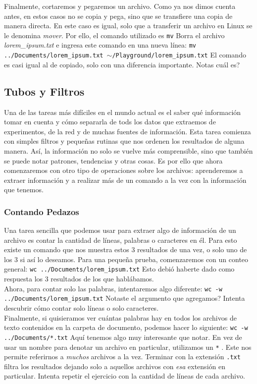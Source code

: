 \documentclass[10pt,letterpaper]{article}
\newcommand{\inlinecode}[1]{
\colorbox{light-gray}{\texttt{#1}}
}
\begin{document}
Finalmente, cortaremos y pegaremos un archivo. Como ya nos dimos cuenta antes, en estos casos no se copia y pega, sino que se transfiere una copia de manera directa. En este caso es igual, solo que a transferir un archivo en Linux se le denomina \emph{mover}. Por ello, el comando utilizado es \inlinecode{mv} Borra el archivo \emph{lorem\_ipsum.txt} e ingresa este comando en una nueva l\'inea: \inlinecode{mv ../Documents/lorem\_ipsum.txt $ \sim $/Playground/lorem\_ipsum.txt} El comando es casi igual al de copiado, solo con una diferencia importante. Notas cu\'al es?

\subsection{Tubos y Filtros}
Una de las tareas m\'as dif\'iciles en el mundo actual es el saber qu\'e informaci\'on tomar en cuenta y c\'omo separarla de tods los datos que extraemos de experimentos, de la red y de muchas fuentes de informaci\'on. Esta tarea comienza con simples filtros y peque\~nas rutinas que nos ordenen los resultados de alguna manera. As\'i, la informaci\'on no solo se vuelve m\'as comprensible, sino que tambi\'en se puede notar patrones, tendencias y otras cosas. Es por ello que ahora comenzaremos con otro tipo de operaciones sobre los archivos: aprenderemos a extraer informaci\'on y a realizar m\'as de un comando a la vez con la informaci\'on que tenemos.

\subsubsection{Contando Pedazos}
Una tarea sencilla que podemos usar para extraer algo de informaci\'on de un archivo es contar la cantidad de l\'ineas, palabras o caracteres en \'el. Para esto existe un comando que nos muestra estos 3 resultados de una vez, o solo uno de los 3 si as\'i lo deseamos. Para una peque\~na prueba, comenzaremos con un conteo general: \inlinecode{wc ../Documents/lorem\_ipsum.txt} Esto debi\'o haberte dado como respuesta los 3 resultados de los que habl\'abamos.\\

Ahora, para contar solo las palabras, intentaremos algo diferente: \inlinecode{wc -w ../Documents/lorem\_ipsum.txt} Notaste el argumento que agregamos? Intenta descubrir c\'omo contar solo l\'ineas o solo caracteres.\\

Finalmente, si quisieramos ver cu\'antas palabras hay en todos los archivos de texto contenidos en la carpeta de documento, podemos hacer lo siguiente: \inlinecode{wc -w ../Documents/*.txt} Aqu\'i tenemos algo muy interesante que notar. En vez de usar un nombre para denotar un archivo en particular, utilizamos un \inlinecode{*}. Este nos permite referirnos a \emph{muchos} archivos a la vez. Terminar con la extensi\'on \inlinecode{.txt} filtra los resultados dejando solo a aquellos archivos con \emph{esa} extensi\'on en particular. Intenta repetir el ejercicio con la cantidad de l\'ineas de cada archivo.
\end{document}
